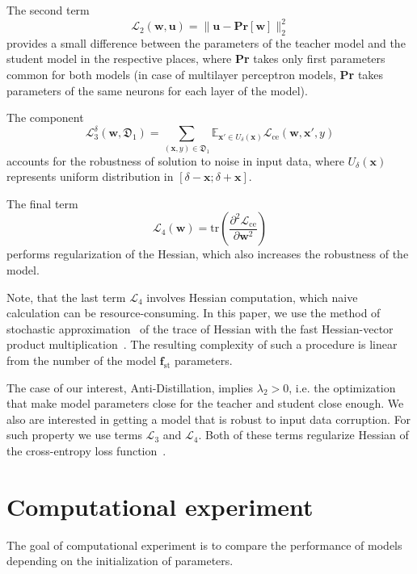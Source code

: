 \documentclass[conference]{IEEEtran}
\begin{document}
The second term \[\mathcal{L}_2 (\mathbf{w}, \mathbf{u}) = \|\textbf{u} - \textbf{Pr}[\textbf{w}]\|^2_2\] provides a small difference between the parameters of the teacher model and the student model in the respective places, where \textbf{Pr} takes only first parameters common for both models (in case of multilayer perceptron models, \textbf{Pr} takes parameters of the same neurons for each layer of the model). 

The component \[\mathcal{L}_3^\delta (\mathbf{w}, \mathfrak{D}_1) = \displaystyle \sum \limits_{(\textbf{x}, y) \in \mathfrak{D}_1} \displaystyle \mathbb{E}_{\textbf{x}' \in U_\delta(\textbf{x})} \mathcal{L}_\text{ce}(\mathbf{w}, \textbf{x}', y)\] accounts for the robustness  of solution to noise in input data, where $U_\delta(\textbf{x})$ represents uniform distribution in $[\delta - \textbf{x}; \delta + \textbf{x}].$

The final term \[\mathcal{L}_4 (\mathbf{w}) = \text{tr} \left(\displaystyle \frac{\partial^2 \mathcal{L}_\text{ce}}{\partial \mathbf{w}^2}\right) \] performs regularization of the Hessian, which also increases the robustness of the model.

Note, that the last term $\mathcal{L}_4 $ involves Hessian computation, which naive calculation can be resource-consuming. In this paper, we use the method of stochastic approximation~\cite{bai1996some} of the trace of Hessian with the fast Hessian-vector product multiplication~\cite{pearlmutter1994fast}. The resulting complexity of such a procedure is linear from the number of the model $\mathbf{f}_\text{st}$ parameters.    


The case of our interest, Anti-Distillation, implies $\lambda_2 >0$, i.e. the optimization that make model parameters close for the teacher and student close enough. We also are interested in getting a model that is robust to input data corruption. For such property we use terms $\mathcal{L}_3$ and $\mathcal{L}_4$. Both of these terms regularize Hessian of the cross-entropy loss function~\cite{yao2020pyhessian,chen2020stabilizing}.

\section{Computational experiment}

The goal of computational experiment is to compare the performance of models depending on the initialization of parameters. 
\end{document}
